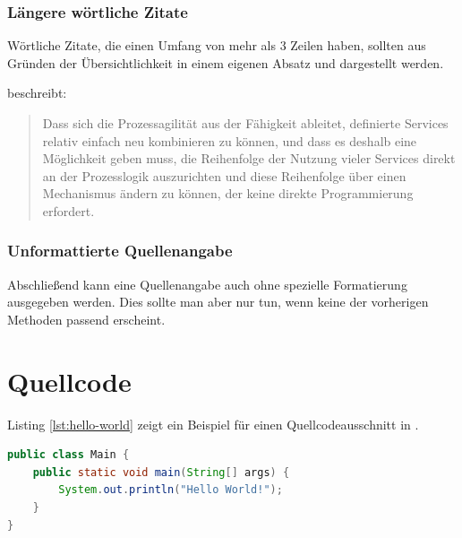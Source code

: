 \subsubsection{Längere wörtliche Zitate}

Wörtliche Zitate, die einen Umfang von mehr als 3 Zeilen haben, sollten aus Gründen der Übersichtlichkeit in einem eigenen Absatz und dargestellt werden.

\textcite[85]{angenendt} beschreibt:

\begin{quote}
Dass sich die Prozessagilität aus der Fähigkeit ableitet, definierte Services relativ einfach neu kombinieren zu können, und dass es deshalb eine Möglichkeit geben muss, die Reihenfolge der Nutzung vieler Services direkt an der Prozesslogik auszurichten und diese Reihenfolge über einen Mechanismus ändern zu können, der keine direkte Programmierung erfordert.
\end{quote}


\subsubsection{Unformattierte Quellenangabe}

Abschließend kann eine Quellenangabe auch ohne spezielle Formatierung ausgegeben werden. Dies sollte man aber nur tun, wenn keine der vorherigen Methoden passend erscheint. \cite[100-101]{angenendt}


\section{Quellcode}

Listing \vref{lst:hello-world} zeigt ein Beispiel für einen Quellcodeausschnitt in \latex.

\begin{lstlisting}[language=Java, caption={Hello World in Java}, label=lst:hello-world]
public class Main {
	public static void main(String[] args) {
		System.out.println("Hello World!");
	}
}
\end{lstlisting}
